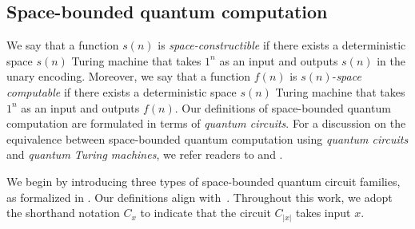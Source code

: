 \documentclass[10pt,a4paper]{article}
\numberwithin{equation}{section}
\numberwithin{figure}{section}
\begin{document}
\subsection{Space-bounded quantum computation}

We say that a function $s(n)$ is \textit{space-constructible} if there exists a deterministic space $s(n)$ Turing machine that takes $1^n$ as an input and outputs $s(n)$ in the unary encoding. 
Moreover, we say that a function $f(n)$ is $s(n)$-\textit{space computable} if there exists a deterministic space $s(n)$ Turing machine that takes $1^n$ as an input and outputs $f(n)$. 
Our definitions of space-bounded quantum computation are formulated in terms of \textit{quantum circuits}. For a discussion on the equivalence between space-bounded quantum computation using \textit{quantum circuits} and \textit{quantum Turing machines}, we refer readers to \cite[Appendix A]{FL18} and \cite[Section 2.2]{FR21}. 

We begin by introducing three types of space-bounded quantum circuit families, as formalized in . Our definitions align with~\cite[Section 2.3]{VW16}. Throughout this work, we adopt the shorthand notation $C_x$ to indicate that the circuit $C_{|x|}$ takes input $x$.
\end{document}

